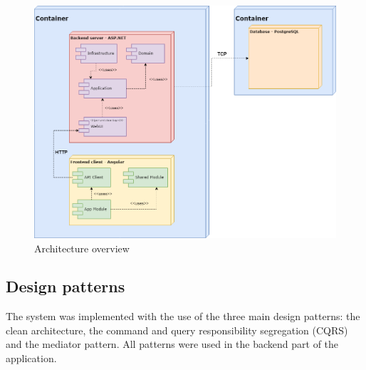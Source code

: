 \documentclass[a4paper,twoside,12pt]{book}
\begin{document}
\begin{figure}[htbp]
\centering
\includegraphics[width=\textwidth]{images/Architecture.drawio.png}
\caption{Architecture overview}
\label{fig:architectureOverview}
\end{figure}

\subsection{Design patterns}
The system was implemented with the use of the three main design patterns: the clean architecture, the command and query responsibility segregation (CQRS) and the mediator pattern. All patterns were used in the backend part of the application.
\end{document}
